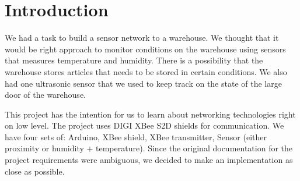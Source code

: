 
%
%
\clearpage


\clearpage


%
%
%


\startpages

%
%
%
%

\chapter{Introduction}

We had a task to build a sensor network to a warehouse. We thought that it would be right approach to monitor conditions on the warehouse using sensors that measures temperature and humidity. There is a possibility that the warehouse stores articles that needs to be stored in certain conditions. We also had one ultrasonic sensor that we used to keep track on the state of the large door of the warehouse. 

This project has the intention for us to learn about networking technologies right on low level. The project uses DIGI XBee S2D shields for communication. We have four sets of: Arduino, XBee shield, XBee transmitter, Sensor (either proximity or humidity + temperature).
Since the original documentation for the project requirements were ambiguous, we decided to make an implementation as close as possible. 

